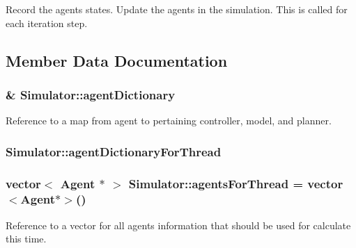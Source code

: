 Record the agents states. Update the agents in the simulation. This is called for each iteration step. 



\subsection{Member Data Documentation}
\subsubsection[{\texorpdfstring{agent\+Dictionary}{agentDictionary}}]{\& Simulator\+::agent\+Dictionary\hspace{0.3cm}{\ttfamily [private]}}\hypertarget{classSimulator_adc23128e4d69f004ce27410cb505bd2a}{}\label{classSimulator_adc23128e4d69f004ce27410cb505bd2a}
Reference to a map from agent to pertaining controller, model, and planner. 
\subsubsection[{\texorpdfstring{agent\+Dictionary\+For\+Thread}{agentDictionaryForThread}}]{ Simulator\+::agent\+Dictionary\+For\+Thread\hspace{0.3cm}{\ttfamily [static]}}\hypertarget{classSimulator_a5e3d11490c6c7fec578feee96166aa44}{}\label{classSimulator_a5e3d11490c6c7fec578feee96166aa44}
\subsubsection[{\texorpdfstring{agents\+For\+Thread}{agentsForThread}}]{\setlength{\rightskip}{0pt plus 5cm}vector$<$ {\bf Agent} $\ast$ $>$ Simulator\+::agents\+For\+Thread = vector$<${\bf Agent}$\ast$$>$()\hspace{0.3cm}{\ttfamily [static]}}\hypertarget{classSimulator_ae7447b3c665ecc437eaea013d3163b67}{}\label{classSimulator_ae7447b3c665ecc437eaea013d3163b67}
Reference to a vector for all agents\textquotesingle{} information that should be used for calculate this time. 
